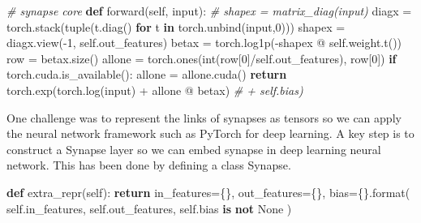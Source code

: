 \documentclass[
]{article}
\newenvironment{Shaded}{}{}
\newcommand{\BuiltInTok}[1]{#1}
\newcommand{\CommentTok}[1]{\textcolor[rgb]{0.38,0.63,0.69}{\textit{#1}}}
\newcommand{\ControlFlowTok}[1]{\textcolor[rgb]{0.00,0.44,0.13}{\textbf{#1}}}
\newcommand{\DecValTok}[1]{\textcolor[rgb]{0.25,0.63,0.44}{#1}}
\newcommand{\KeywordTok}[1]{\textcolor[rgb]{0.00,0.44,0.13}{\textbf{#1}}}
\newcommand{\NormalTok}[1]{#1}
\newcommand{\OperatorTok}[1]{\textcolor[rgb]{0.40,0.40,0.40}{#1}}
\newcommand{\SpecialCharTok}[1]{\textcolor[rgb]{0.25,0.44,0.63}{#1}}
\newcommand{\StringTok}[1]{\textcolor[rgb]{0.25,0.44,0.63}{#1}}
\newcommand{\VariableTok}[1]{\textcolor[rgb]{0.10,0.09,0.49}{#1}}
\begin{document}
\begin{Shaded}
\begin{Highlighting}[]
    \CommentTok{\# synapse core}
    \KeywordTok{def}\NormalTok{ forward(}\VariableTok{self}\NormalTok{, }\BuiltInTok{input}\NormalTok{):}
        \CommentTok{\# shapex = matrix\_diag(input)}
\NormalTok{        diagx }\OperatorTok{=}\NormalTok{ torch.stack(}\BuiltInTok{tuple}\NormalTok{(t.diag() }\ControlFlowTok{for}\NormalTok{ t }\KeywordTok{in}\NormalTok{ torch.unbind(}\BuiltInTok{input}\NormalTok{,}\DecValTok{0}\NormalTok{)))}
\NormalTok{        shapex }\OperatorTok{=}\NormalTok{ diagx.view(}\OperatorTok{{-}}\DecValTok{1}\NormalTok{, }\VariableTok{self}\NormalTok{.out\_features)}
\NormalTok{        betax }\OperatorTok{=}\NormalTok{ torch.log1p(}\OperatorTok{{-}}\NormalTok{shapex }\OperatorTok{@} \VariableTok{self}\NormalTok{.weight.t())}
\NormalTok{        row }\OperatorTok{=}\NormalTok{ betax.size()}
\NormalTok{        allone }\OperatorTok{=}\NormalTok{ torch.ones(}\BuiltInTok{int}\NormalTok{(row[}\DecValTok{0}\NormalTok{]}\OperatorTok{/}\VariableTok{self}\NormalTok{.out\_features), row[}\DecValTok{0}\NormalTok{])}
        \ControlFlowTok{if}\NormalTok{ torch.cuda.is\_available():}
\NormalTok{          allone }\OperatorTok{=}\NormalTok{ allone.cuda()}
        \ControlFlowTok{return}\NormalTok{ torch.exp(torch.log(}\BuiltInTok{input}\NormalTok{) }\OperatorTok{+}\NormalTok{ allone }\OperatorTok{@}\NormalTok{ betax) }\CommentTok{\# + self.bias)    }
\end{Highlighting}
\end{Shaded}

One challenge was to represent the links of synapses as tensors so we
can apply the neural network framework such as PyTorch for deep
learning. A key step is to construct a Synapse layer so we can embed
synapse in deep learning neural network. This has been done by defining
a class Synapse.

\begin{Shaded}
\begin{Highlighting}[]
    \KeywordTok{def}\NormalTok{ extra\_repr(}\VariableTok{self}\NormalTok{):}
        \ControlFlowTok{return} \StringTok{\textquotesingle{}in\_features=}\SpecialCharTok{\{\}}\StringTok{, out\_features=}\SpecialCharTok{\{\}}\StringTok{, bias=}\SpecialCharTok{\{\}}\StringTok{\textquotesingle{}}\NormalTok{.}\BuiltInTok{format}\NormalTok{(}
            \VariableTok{self}\NormalTok{.in\_features, }\VariableTok{self}\NormalTok{.out\_features, }\VariableTok{self}\NormalTok{.bias }\KeywordTok{is} \KeywordTok{not} \VariableTok{None}
\NormalTok{        )}
\end{Highlighting}
\end{Shaded}
\end{document}
